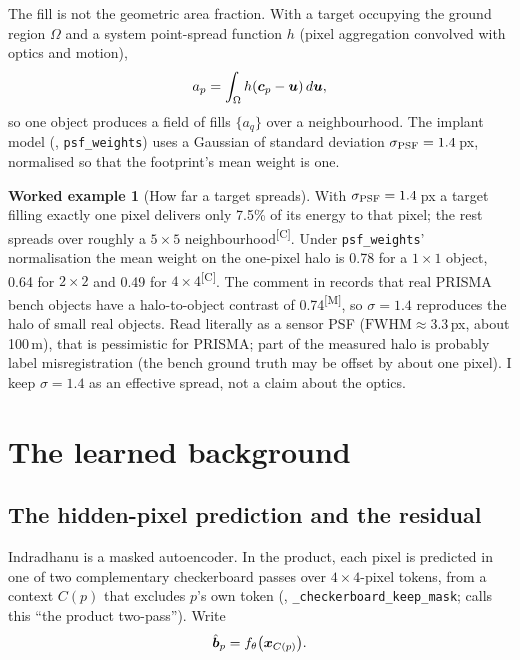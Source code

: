 \documentclass[11pt,a4paper]{article}
\theoremstyle{plain}
\theoremstyle{definition}
\newtheorem{example}[proposition]{Worked example}
\theoremstyle{remark}
\newcommand{\x}{\B{x}}
\newcommand{\bh}{\hat{\B{b}}}
\newcommand{\meas}{\textsuperscript{\textsf{\scriptsize[M]}}}
\newcommand{\comp}{\textsuperscript{\textsf{\scriptsize[C]}}}
\begin{document}
The fill is not the geometric area fraction. With a target occupying the ground region $\Omega$ and a system
point-spread function $h$ (pixel aggregation convolved with optics and motion),
\[
  a_p=\int_\Omega h(\bm{c}_p-\bm{u})\,d\bm{u} ,
\]
so one object produces a field of fills $\{a_q\}$ over a neighbourhood. The implant model
(, \verb|psf_weights|) uses a Gaussian of standard deviation $\sigma_{\rm PSF}=1.4$\,px,
normalised so that the footprint's mean weight is one.

\begin{example}[How far a target spreads]
\label{ex:psf}
With $\sigma_{\rm PSF}=1.4$\,px a target filling exactly one pixel delivers only 7.5\% of its energy to that pixel;
the rest spreads over roughly a $5\times5$ neighbourhood\comp. Under \verb|psf_weights|' normalisation the mean
weight on the one-pixel halo is 0.78 for a $1\times1$ object, 0.64 for $2\times2$ and 0.49 for $4\times4$\comp.
The comment in  records that real PRISMA bench objects have a halo-to-object contrast of 0.74\meas,
so $\sigma=1.4$ reproduces the halo of small real objects. Read literally as a sensor PSF ($\mathrm{FWHM}\approx3.3$\,px,
about 100\,m), that is pessimistic for PRISMA; part of the measured halo is probably label misregistration (the
bench ground truth may be offset by about one pixel). I keep $\sigma=1.4$ as an effective spread, not a claim about
the optics.
\end{example}

\section{The learned background}
\label{sec:learned}

\subsection{The hidden-pixel prediction and the residual}

Indradhanu is a masked autoencoder. In the product, each pixel is predicted in one of two complementary
checkerboard passes over $4\times4$-pixel tokens, from a context $C(p)$ that excludes $p$'s own token
(, \verb|_checkerboard_keep_mask|; 
calls this ``the product two-pass''). Write
\[
  \bh_p = f_\theta\big(\x_{C(p)}\big).
\]
\end{document}
